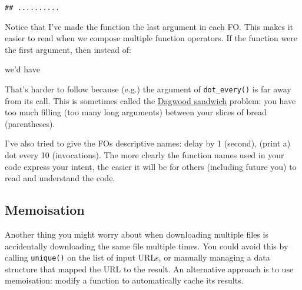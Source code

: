 \begin{verbatim}
## ..........
\end{verbatim}

Notice that I've made the function the last argument in each FO. This
makes it easier to read when we compose multiple function operators. If
the function were the first argument, then instead of:

\begin{Shaded}
\begin{Highlighting}[]
\StringTok{ }\NormalTok{(}\NormalTok{, }\NormalTok{(}
\end{Highlighting}
\end{Shaded}

we'd have

\begin{Shaded}
\begin{Highlighting}[]
\StringTok{ }\NormalTok{(}\NormalTok{), }\NormalTok{)}
\end{Highlighting}
\end{Shaded}

That's harder to follow because (e.g.) the argument of
\texttt{dot\_every()} is far away from its call. This is sometimes
called the \href{http://en.wikipedia.org/wiki/Dagwood_sandwich}{Dagwood
sandwich} problem: you have too much filling (too many long arguments)
between your slices of bread (parentheses).

I've also tried to give the FOs descriptive names: delay by 1 (second),
(print a) dot every 10 (invocations). The more clearly the function
names used in your code express your intent, the easier it will be for
others (including future you) to read and understand the code.

\hypertarget{memoisation}{%
\subsection{Memoisation}\label{memoisation}}

Another thing you might worry about when downloading multiple files is
accidentally downloading the same file multiple times. You could avoid
this by calling \texttt{unique()} on the list of input URLs, or manually
managing a data structure that mapped the URL to the result. An
alternative approach is to use memoisation: modify a function to
automatically cache its results. 

